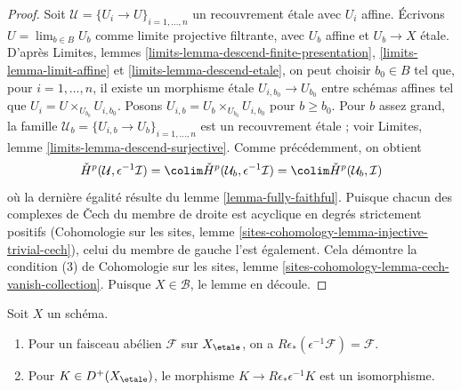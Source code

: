 \begin{proof}
\medskip\noindent
Soit $\mathcal{U} = \{U_i \to U\}_{i = 1, \ldots, n}$ un recouvrement \'etale
avec $U_i$ affine. Écrivons $U = \lim_{b \in B} U_b$ comme limite projective filtrante,
avec $U_b$ affine et $U_b \to X$ \'etale.
D'après Limites, lemmes \ref{limits-lemma-descend-finite-presentation},
\ref{limits-lemma-limit-affine} et
\ref{limits-lemma-descend-etale},
on peut choisir $b_0 \in B$ tel que, pour $i = 1, \ldots, n$, il existe un
morphisme \'etale $U_{i, b_0} \to U_{b_0}$ entre schémas affines
tel que $U_i = U \times_{U_{b_0}} U_{i, b_0}$.
Posons $U_{i, b} = U_b \times_{U_{b_0}} U_{i, b_0}$ pour $b \geq b_0$.
Pour $b$ assez grand, la famille
$\mathcal{U}_b = \{U_{i, b} \to U_b\}_{i = 1, \ldots, n}$
est un recouvrement \'etale ; voir
Limites, lemme \ref{limits-lemma-descend-surjective}.
Comme précédemment, on obtient
$$
\check{H}^p(\mathcal{U}, \epsilon^{-1}\mathcal{I}) =
\colim \check{H}^p(\mathcal{U}_b, \epsilon^{-1}\mathcal{I}) =
\colim \check{H}^p(\mathcal{U}_b, \mathcal{I})
$$
où la dernière égalité résulte du lemme \ref{lemma-fully-faithful}.
Puisque chacun des complexes de {\v C}ech du membre de droite est
acyclique en degrés strictement positifs
(Cohomologie sur les sites, lemme
\ref{sites-cohomology-lemma-injective-trivial-cech}),
celui du membre de gauche l'est également. Cela démontre la condition (3) de
Cohomologie sur les sites, lemme \ref{sites-cohomology-lemma-cech-vanish-collection}.
Puisque $X \in \mathcal{B}$, le lemme en découle.
\end{proof}

\begin{lemma}
\label{lemma-relative-comparison}
Soit $X$ un schéma.
\begin{enumerate}
\item Pour un faisceau abélien $\mathcal{F}$ sur $X_\etale$,
on a $R\epsilon_*(\epsilon^{-1}\mathcal{F}) = \mathcal{F}$.
\item Pour $K \in D^+(X_\etale)$, le morphisme $K \to R\epsilon_*\epsilon^{-1}K$
est un isomorphisme.
\end{enumerate}
\end{lemma}

